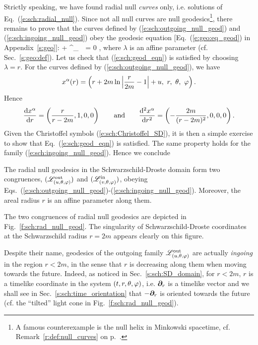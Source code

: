 Strictly speaking, we have found radial null \emph{curves} only, i.e. solutions of
Eq.~(\ref{e:sch:radial_null}). Since not all null curves
are null geodesics\footnote{A famous counterexample is the null helix in Minkowski
spacetime, cf. Remark~\ref{r:def:null_curves} on p.~\pageref{r:def:null_curves}.}, there remains to prove that the curves defined
by (\ref{e:sch:outgoing_null_geod}) and (\ref{e:sch:ingoing_null_geod})
obey the geodesic equation [Eq.~(\ref{e:geo:eq_geod}) in Appendix~\ref{s:geo}]:
\be \label{e:sch:geod_eqn}
     + \Gamma^\alpha_{\ \, \mu\nu}
          = 0 ,
\ee
where $\lambda$ is an affine parameter (cf. Sec.~\ref{s:geo:def}).
Let us check that (\ref{e:sch:geod_eqn}) is satisfied by choosing $\lambda=r$.
For the curves defined by (\ref{e:sch:outgoing_null_geod}), we have
\[
    x^\alpha(r) = \left( r + 2 m \ln \left| \frac{r}{2m} - 1 \right| + u,\ r,\  \theta,\  \varphi \right) .
\]
Hence
\[
    \frac{\mathrm{d} x^\alpha}{\mathrm{d} r} = \left( \frac{r}{r-2m}, 1, 0, 0 \right)
    \qquad\mbox{and}\qquad
    \frac{\mathrm{d}^2 x^\alpha}{\mathrm{d} r^2} = \left( - \frac{2m}{(r-2m)^2}, 0, 0, 0 \right) .
\]
Given the Christoffel symbols (\ref{e:sch:Christoffel_SD}), it is then a
simple exercise to show that Eq.~(\ref{e:sch:geod_eqn}) is satisfied.
The same property holds for the family (\ref{e:sch:ingoing_null_geod}). Hence
we conclude
\begin{prop}
The radial null geodesics in the Schwarzschild-Droste domain
form two congruences, $(\mathscr{L}^{\rm out}_{(u,\theta,\varphi)})$ and $(\mathscr{L}^{\rm in}_{(v,\theta,\varphi)})$,
obeying Eqs.~(\ref{e:sch:outgoing_null_geod})-(\ref{e:sch:ingoing_null_geod}).
Moreover, the areal radius $r$ is an affine parameter along them.
\end{prop}

The two congruences of radial null geodesics are depicted in
Fig.~\ref{f:sch:rad_null_geod}.
The singularity of Schwarzschild-Droste coordinates at
the Schwarzschild radius $r=2m$
appears clearly on this figure.


\begin{remark} \label{r:sch:outgoing_ingoing}
Despite their name, geodesics of the outgoing family $\mathscr{L}^{\rm out}_{(u,\theta,\varphi)}$ are actually
\emph{ingoing} in the region $r<2m$, in the sense that
$r$ is decreasing along them when moving towards the future. Indeed,
as noticed in Sec.~\ref{s:sch:SD_domain},
for $r<2m$, $r$ is a timelike coordinate in the system $(t,r,\theta,\varphi)$,
i.e. $\bm{\partial}_r$ is a timelike vector and we shall see in Sec.~\ref{s:sch:time_orientation}
that $-\bm{\partial}_r$ is oriented towards the future (cf. the ``tilted'' light cone
in Fig.~\ref{f:sch:rad_null_geod}).
\end{remark}

